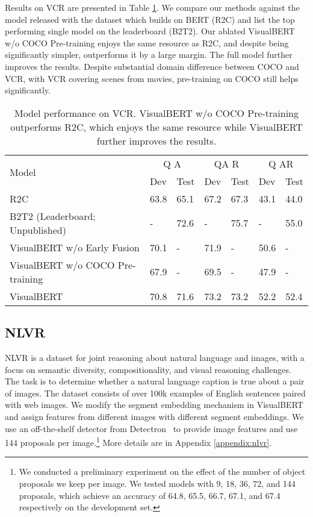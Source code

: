 \documentclass{article} \usepackage{iclr2019_conference,times}
\newcommand{\model}{VisualBERT\xspace}
\newcommand{\nlvr}{NLVR\xspace}
\newcommand{\modelnp}{VisualBERT w/o COCO Pre-training\xspace}
\newcommand{\modelby}{VisualBERT w/o Early Fusion\xspace}
\newcommand{\modelp}{VisualBERT\xspace}
\begin{document}
Results on VCR are presented in Table \ref{vcr}.
We compare our methods against the model released with the dataset which builds on BERT (R2C) and list the top performing single model on the leaderboard (B2T2). Our ablated \modelnp enjoys the same resource as R2C, and despite being significantly simpler, outperforms it by a large margin. The full model further improves the results. Despite substantial domain difference between COCO and VCR, with VCR covering scenes from movies, pre-training on COCO still helps significantly. 

\begin{table}[h]
\small
\caption{Model performance on VCR. \modelnp outperforms R2C, which enjoys the same resource while \model further improves the results.}
\label{vcr}
\begin{center}
\begin{tabular}{l|llllll}
\toprule

\multirow{2}{*}{Model} & \multicolumn{2}{c}{Q  A} & \multicolumn{2}{c}{QA  R} & \multicolumn{2}{c}{Q  AR} \\ 
  & Dev & Test & Dev & Test & Dev & Test  \\ 
\midrule

R2C \citep{zellers2019recognition} & 63.8 & 65.1 & 67.2 & 67.3 & 43.1 & 44.0 \\
B2T2 (Leaderboard; Unpublished) & -  & 72.6 & - &75.7 &- & 55.0 \\
\midrule

\modelby & 70.1 & - & 71.9 & - & 50.6 & - \\

\modelnp & 67.9 & - & 69.5 & - & 47.9 & - \\ 

\modelp & 70.8 & 71.6  & 73.2 & 73.2 & 52.2 & 52.4 \\

\bottomrule
\end{tabular}
\end{center}
\end{table}


\subsection{\nlvr}

\nlvr is a dataset for joint reasoning about natural language and images, with a focus on semantic diversity, compositionality, and visual reasoning challenges.
The task is to determine whether a natural language caption is true about a pair of images.
The dataset consists of over 100k examples of English sentences paired with web images.
We modify the segment embedding mechanism in \model and assign features from different images with different segment embeddings. We use an off-the-shelf detector from Detectron~\citep{Detectron2018} to provide image features and use 144 proposals per image.\footnote{We conducted a preliminary experiment on the effect of the number of object proposals we keep per image. We tested models with 9, 18, 36, 72, and 144 proposals, which achieve an accuracy of 64.8, 65.5, 66.7, 67.1, and 67.4 respectively on the development set.} More details are in Appendix \ref{appendix:nlvr}.
\end{document}
